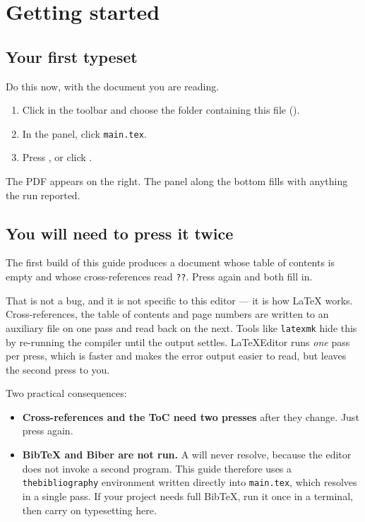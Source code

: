 \section{Getting started}
\label{sec:start}

\subsection{Your first typeset}

Do this now, with the document you are reading.

\begin{enumerate}[leftmargin=*]
  \item Click  in the toolbar and choose the folder
        containing this file ().
  \item In the  panel, click \texttt{main.tex}.
  \item Press , or click .
\end{enumerate}

The PDF appears on the right. The  panel along the bottom fills with
anything the run reported.

\subsection{You will need to press it twice}
\label{sec:passes}

The first build of this guide produces a document whose table of contents is
empty and whose cross-references read \texttt{??}. Press  again and
both fill in.

That is not a bug, and it is not specific to this editor --- it is how \LaTeX{}
works. Cross-references, the table of contents and page numbers are written to
an auxiliary file on one pass and read back on the next. Tools like
\texttt{latexmk} hide this by re-running the compiler until the output settles.
LaTeXEditor runs \emph{one} pass per press, which is faster and makes the error
output easier to read, but leaves the second press to you.

Two practical consequences:

\begin{itemize}[leftmargin=*]
  \item \textbf{Cross-references and the ToC need two presses} after they
        change. Just press  again.
  \item \textbf{BibTeX and Biber are not run.} A \verb||
        will never resolve, because the editor does not invoke a second
        program. This guide therefore uses a \texttt{thebibliography}
        environment written directly into \texttt{main.tex}, which resolves in
        a single pass. If your project needs full BibTeX, run it once in a
        terminal, then carry on typesetting here.
\end{itemize}

